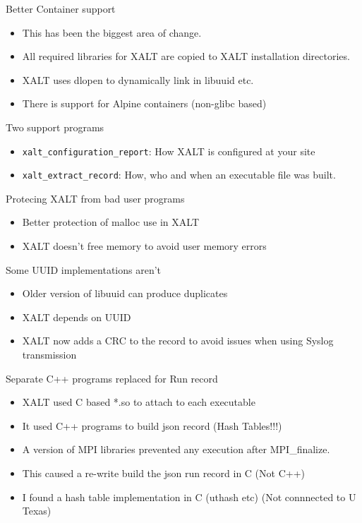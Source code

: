 \documentclass{beamer}
\begin{document}
\begin{frame}{Better Container support}
  \begin{itemize}
    \item This has been the biggest area of change.
    \item All required libraries for XALT are copied to XALT
      installation directories.
    \item XALT uses dlopen to dynamically link in libuuid etc.
    \item There is support for Alpine containers (non-glibc based)
  \end{itemize}
\end{frame}

\begin{frame}{Two support programs}
  \begin{itemize}
    \item \texttt{xalt\_configuration\_report}: How XALT is configured
      at your site
    \item \texttt{xalt\_extract\_record}: How, who and when an
      executable file was built.
  \end{itemize}
\end{frame}

\begin{frame}{Protecing XALT from bad user programs}
  \begin{itemize}
    \item Better protection of malloc use in XALT
    \item XALT doesn't free memory to avoid user memory errors
  \end{itemize}
\end{frame}


\begin{frame}{Some UUID implementations aren't }
  \begin{itemize}
    \item Older version of libuuid can produce duplicates
    \item XALT depends on UUID
    \item XALT now adds a CRC to the record to avoid issues when using
      Syslog transmission
  \end{itemize}
\end{frame}

\begin{frame}{Separate C++ programs replaced for Run record}
  \begin{itemize}
    \item XALT used C based *.so to attach to each executable
    \item It used C++ programs to build json record (Hash Tables!!!)
    \item A version of MPI libraries prevented any execution after
      MPI\_finalize.
    \item This caused a re-write build the json run record in C (Not
      C++)
    \item I found a hash table implementation in C (uthash etc) (Not
      connnected to U Texas)
  \end{itemize}
\end{frame}
\end{document}
